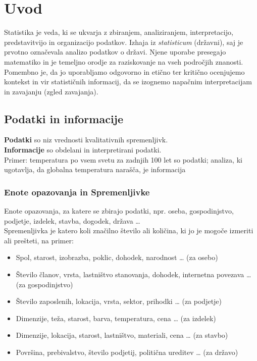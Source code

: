 \chapter{Uvod}

Statistika je veda, ki se ukvarja z zbiranjem, analiziranjem, interpretacijo, predstavitvijo in organizacijo podatkov. Izhaja iz \textit{statisticum} (državni), saj je prvotno označevala analizo podatkov o državi. Njene uporabe presegajo matematiko in je temeljno orodje za raziskovanje na vseh področjih znanosti. Pomembno je, da jo uporabljamo odgovorno in etično ter kritično ocenjujemo kontekst in vir statističnih informacij, da se izognemo napačnim interpretacijam in zavajanju (zgled zavajanja).

\section{Podatki in informacije}

\textbf{Podatki} so niz vrednosti kvalitativnih spremenljivk.\\
\textbf{Informacije} so obdelani in interpretirani podatki.\\
Primer: temperatura po vsem svetu za zadnjih 100 let so podatki; analiza, ki ugotavlja, da globalna temperatura narašča, je informacija


\subsection{Enote opazovanja in Spremenljivke}

Enote opazovanja, za katere se zbirajo podatki, npr. oseba, gospodinjstvo, podjetje, izdelek, stavba, dogodek, država …\\
Spremenljivka je katero koli značilno število ali količina, ki jo je mogoče izmeriti ali prešteti, na primer:
\begin{itemize}
\item Spol, starost, izobrazba, poklic, dohodek, narodnost … (za osebo)
\item Število članov, vrsta, lastništvo stanovanja, dohodek, internetna povezava … (za gospodinjstvo)
\item Število zaposlenih, lokacija, vrsta, sektor, prihodki … (za podjetje)
\item Dimenzije, teža, starost, barva, temperatura, cena … (za izdelek)
\item Dimenzije, lokacija, starost, lastništvo, materiali, cena … (za stavbo)
\item Površina, prebivalstvo, število podjetij, politična ureditev … (za državo)
\end{itemize}


